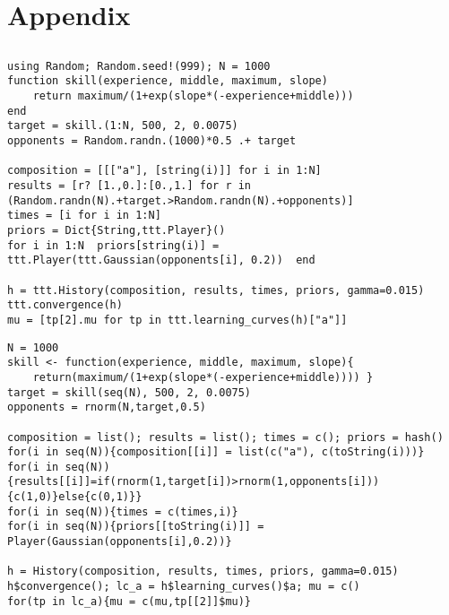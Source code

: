 \documentclass[article]{jss}
\newif\ifen
\newif\ifes
\newcommand{\en}[1]{\ifen#1\fi}
\newcommand{\es}[1]{\ifes#1\fi}
\begin{document}
\newpage
\section{Appendix} \label{app:technical}

\subsection{\en{Skill evolution}}\label{sec:appendix_skill_evolution}

\en{We attach the \proglang{Julia} and \proglang{R} codes that solve the example presented in the section \ref{sec:skill_evolution} about estimation the skill evolution of a new player.}
\es{Adjuntamos los códigos de \proglang{Julia} y \proglang{R} que resuelven el ejemplo presentado en la sección \ref{sec:skill_evolution} sobre la evolución de habilidad de un jugador nuevo.}
%
\begin{lstlisting}[backgroundcolor=\color{julia},caption={\en{\proglang{Julia} code}\es{Código \proglang{Julia}}},aboveskip=0.0 \baselineskip, belowskip=0.1cm]
using Random; Random.seed!(999); N = 1000
function skill(experience, middle, maximum, slope)
    return maximum/(1+exp(slope*(-experience+middle))) 
end
target = skill.(1:N, 500, 2, 0.0075)
opponents = Random.randn.(1000)*0.5 .+ target

composition = [[["a"], [string(i)]] for i in 1:N]
results = [r? [1.,0.]:[0.,1.] for r in (Random.randn(N).+target.>Random.randn(N).+opponents)]
times = [i for i in 1:N]
priors = Dict{String,ttt.Player}()
for i in 1:N  priors[string(i)] = ttt.Player(ttt.Gaussian(opponents[i], 0.2))  end

h = ttt.History(composition, results, times, priors, gamma=0.015)
ttt.convergence(h)
mu = [tp[2].mu for tp in ttt.learning_curves(h)["a"]]
\end{lstlisting}
%
\begin{lstlisting}[backgroundcolor=\color{r},caption={\en{\proglang{R} code}\es{Código \proglang{R}}},aboveskip=0.0 \baselineskip, belowskip=0.1cm]
N = 1000
skill <- function(experience, middle, maximum, slope){
    return(maximum/(1+exp(slope*(-experience+middle)))) }
target = skill(seq(N), 500, 2, 0.0075)
opponents = rnorm(N,target,0.5)

composition = list(); results = list(); times = c(); priors = hash()
for(i in seq(N)){composition[[i]] = list(c("a"), c(toString(i)))}
for(i in seq(N)){results[[i]]=if(rnorm(1,target[i])>rnorm(1,opponents[i])){c(1,0)}else{c(0,1)}}
for(i in seq(N)){times = c(times,i)}
for(i in seq(N)){priors[[toString(i)]] = Player(Gaussian(opponents[i],0.2))}
    
h = History(composition, results, times, priors, gamma=0.015)
h$convergence(); lc_a = h$learning_curves()$a; mu = c()
for(tp in lc_a){mu = c(mu,tp[[2]]$mu)}
\end{lstlisting}
\end{document}
